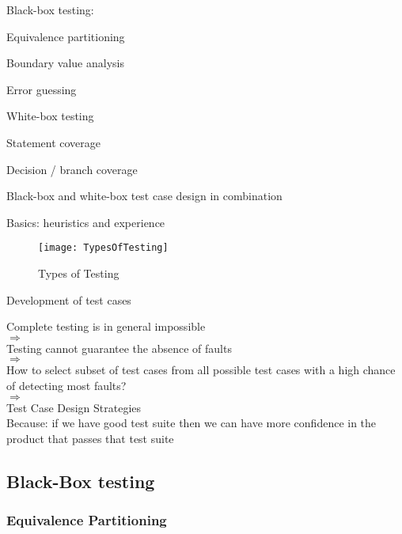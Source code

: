\begin{itemize*}
	\item Black-box testing:
	\begin{itemize*}
		\item Equivalence partitioning
		\item Boundary value analysis
		\item Error guessing
	\end{itemize*}
	\item White-box testing
	\begin{itemize*}
		\item Statement coverage
		\item Decision / branch coverage
	\end{itemize*}
	\item Black-box and white-box test case design in combination
	\item Basics: heuristics and experience
\end{itemize*}

\begin{figure}
	\centering
	\texttt{[image: TypesOfTesting]}
    \caption{Types of Testing}
\end{figure}

Development of test cases

\begin{center}
Complete testing is in general impossible\\ $\Rightarrow$\\
Testing cannot guarantee the absence of faults\\ $\Rightarrow$\\
How to select subset of test cases from all possible test cases with a high chance of detecting most faults?\\
$\Rightarrow$\\
Test Case Design Strategies\\

Because: if we have good test suite then we can have more confidence in the product that passes that test suite
\end{center}

\subsection{Black-Box testing}

\subsubsection{Equivalence Partitioning}

